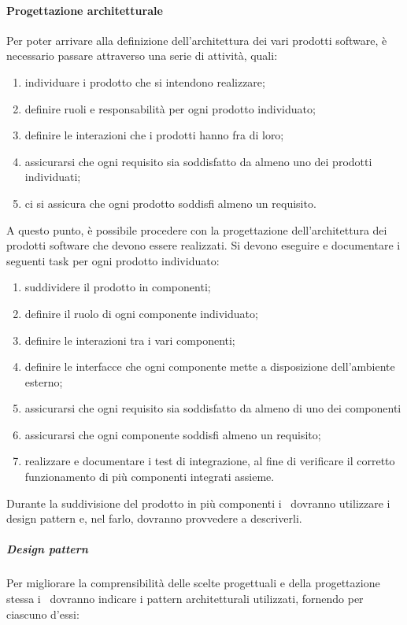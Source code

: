 \documentclass[../NormeProgetto.tex]{subfiles}
\begin{document}
		\paragraph{Progettazione architetturale}
			Per poter arrivare alla definizione dell'architettura dei vari prodotti software, è necessario passare attraverso una serie di attività, quali:
			\begin{enumerate}
				\item individuare i prodotto che si intendono realizzare;
				\item definire ruoli e responsabilità per ogni prodotto individuato;
				\item definire le interazioni che i prodotti hanno fra di loro;
				\item assicurarsi che ogni requisito sia soddisfatto da almeno uno dei prodotti individuati;
				\item ci si assicura che ogni prodotto soddisfi almeno un requisito.
			\end{enumerate}
			A questo punto, è possibile procedere con la progettazione dell'architettura dei prodotti software che devono essere realizzati. Si devono eseguire e documentare i seguenti task per ogni prodotto individuato:
			\begin{enumerate}
				\item suddividere il prodotto in componenti;
				\item definire il ruolo di ogni componente individuato;
				\item definire le interazioni tra i vari componenti;
				\item definire le interfacce che ogni componente mette a disposizione dell'ambiente esterno;
				\item assicurarsi che ogni requisito sia soddisfatto da almeno di uno dei componenti
				\item assicurarsi che ogni componente soddisfi almeno un requisito;
				\item realizzare e documentare i test di integrazione, al fine di verificare il corretto funzionamento di più componenti integrati assieme.
			\end{enumerate}
			Durante la suddivisione del prodotto in più componenti i \progettisti\ dovranno utilizzare i design pattern e, nel farlo, dovranno provvedere a descriverli.
			\subparagraph{Design pattern}
				Per migliorare la comprensibilità delle scelte progettuali e della progettazione stessa i \progettisti\ dovranno indicare i pattern architetturali utilizzati, fornendo per ciascuno d'essi:
\end{document}
